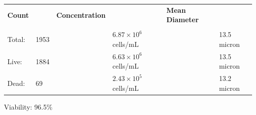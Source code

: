 \documentclass[UTF8,10pt,a4paper,fontset=fandol]{ctexart}
\newcommand{\fieldvalue}[1]{#1}
\begin{document}
\vspace{0.4em}
\begin{tabularx}{\textwidth}{@{}lXlXlX@{}}
\textbf{Count} & & \textbf{Concentration} & & \textbf{Mean Diameter} & \\[-0.2em]
\underline{\hspace{3.2em}} & & \underline{\hspace{5.8em}} & &
\underline{\hspace{6.8em}} & \\[0.25em]
Total:
&
\fieldvalue{1953}
&
&
\fieldvalue{$6.87 \times 10^{6}$ cells/mL}
&
&
\fieldvalue{13.5 micron}
\\
Live:
&
\fieldvalue{1884}
&
&
\fieldvalue{$6.63 \times 10^{6}$ cells/mL}
&
&
\fieldvalue{13.5 micron}
\\
Dead:
&
\fieldvalue{69}
&
&
\fieldvalue{$2.43 \times 10^{5}$ cells/mL}
&
&
\fieldvalue{13.2 micron}
\end{tabularx}

\vspace{0.6em}
Viability:
\fieldvalue{96.5\%}

\vspace{1em}

\noindent
\begin{minipage}[t]{0.43\textwidth}
\centering
\fbox{\rule{0pt}{3.0cm}\rule{0.95\linewidth}{0pt}}
\end{minipage}
\hfill
\begin{minipage}[t]{0.43\textwidth}
\centering
\fbox{\rule{0pt}{3.0cm}\rule{0.95\linewidth}{0pt}}
\end{minipage}

\vspace{1.5em}

\noindent
\begin{minipage}[t]{0.43\textwidth}
\centering
\fbox{\rule{0pt}{3.0cm}\rule{0.95\linewidth}{0pt}}
\end{minipage}
\hfill
\begin{minipage}[t]{0.43\textwidth}
\centering
\fbox{\rule{0pt}{3.0cm}\rule{0.95\linewidth}{0pt}}
\end{minipage}
\end{document}
